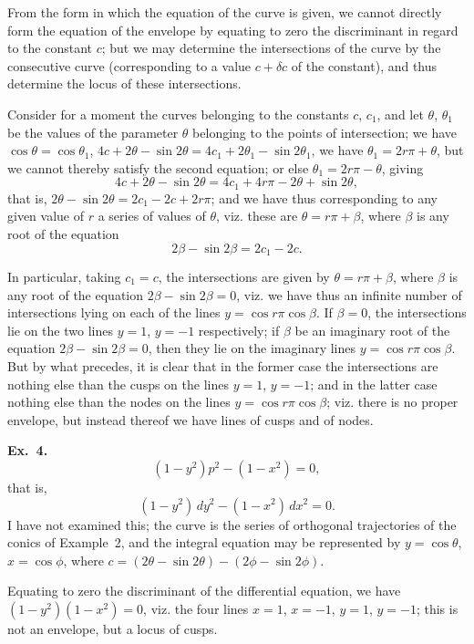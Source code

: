 \documentclass[12pt,a4paper]{article}
\theoremstyle{plain}
\theoremstyle{definition}
\theoremstyle{remark}
\begin{document}
From the form in which the equation of the curve is given, we cannot directly form the equation of the envelope by equating to zero the discriminant in regard to the constant $c$; but we may determine the intersections of the curve by the consecutive curve (corresponding to a value $c + \delta c$ of the constant), and thus determine the locus of these intersections.

Consider for a moment the curves belonging to the constants $c$, $c_1$, and let $\theta$, $\theta_1$ be the values of the parameter $\theta$ belonging to the points of intersection; we have $\cos\theta = \cos\theta_1$, $4c + 2\theta - \sin 2\theta = 4c_1 + 2\theta_1 - \sin 2\theta_1$, we have $\theta_1 = 2r\pi + \theta$, but we cannot thereby satisfy the second equation; or else $\theta_1 = 2r\pi - \theta$, giving
\[
4c + 2\theta - \sin 2\theta = 4c_1 + 4r\pi - 2\theta + \sin 2\theta,
\]
that is, $2\theta - \sin 2\theta = 2c_1 - 2c + 2r\pi$; and we have thus corresponding to any given value of $r$ a series of values of $\theta$, viz. these are $\theta = r\pi + \beta$, where $\beta$ is any root of the equation
\[
2\beta - \sin 2\beta = 2c_1 - 2c.
\]

In particular, taking $c_1 = c$, the intersections are given by $\theta = r\pi + \beta$, where $\beta$ is any root of the equation $2\beta - \sin 2\beta = 0$, viz. we have thus an infinite number of intersections lying on each of the lines $y = \cos r\pi \cos\beta$. If $\beta = 0$, the intersections lie on the two lines $y = 1$, $y = -1$ respectively; if $\beta$ be an imaginary root of the equation $2\beta - \sin 2\beta = 0$, then they lie on the imaginary lines $y = \cos r\pi \cos\beta$. But by what precedes, it is clear that in the former case the intersections are nothing else than the cusps on the lines $y = 1$, $y = -1$; and in the latter case nothing else than the nodes on the lines $y = \cos r\pi \cos\beta$; viz. there is no proper envelope, but instead thereof we have lines of cusps and of nodes.

\medskip\noindent\textbf{Ex.~4.}
\[
(1-y^2)p^2 - (1-x^2) = 0,
\]
that is,
\[
(1-y^2)\, dy^2 - (1-x^2)\, dx^2 = 0.
\]
I have not examined this; the curve is the series of orthogonal trajectories of the conics of Example~2, and the integral equation may be represented by $y = \cos\theta$, $x = \cos\phi$, where $c = (2\theta - \sin 2\theta) - (2\phi - \sin 2\phi)$.

Equating to zero the discriminant of the differential equation, we have $(1-y^2)(1-x^2) = 0$, viz. the four lines $x = 1$, $x = -1$, $y = 1$, $y = -1$; this is not an envelope, but a locus of cusps.
\end{document}
